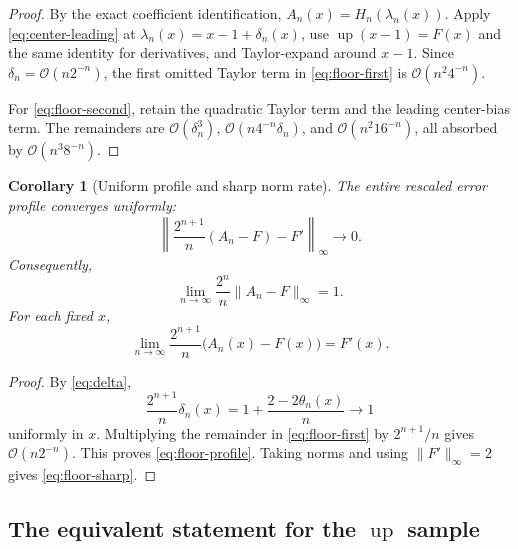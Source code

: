 \documentclass[11pt,oneside]{article}
\newtheorem{corollary}[theorem]{Corollary}
\theoremstyle{definition}
\theoremstyle{remark}
\newcommand{\Up}{\operatorname{up}}
\newcommand{\bigO}{\mathcal O}
\begin{document}
\begin{proof}
By the exact coefficient identification,
$A_n(x)=H_n(\lambda_n(x))$.  Apply \eqref{eq:center-leading} at
$\lambda_n(x)=x-1+\delta_n(x)$, use $\Up(x-1)=F(x)$ and the same identity for derivatives,
and Taylor-expand around $x-1$.  Since $\delta_n=\bigO(n2^{-n})$, the first omitted Taylor
term in \eqref{eq:floor-first} is $\bigO(n^2 4^{-n})$.

For \eqref{eq:floor-second}, retain the quadratic Taylor term and the leading center-bias
term.  The remainders are
$\bigO(\delta_n^3)$, $\bigO(n4^{-n}\delta_n)$, and
$\bigO(n^2 16^{-n})$, all absorbed by $\bigO(n^3 8^{-n})$.
\end{proof}

\begin{corollary}[Uniform profile and sharp norm rate]
\label{cor:floor-sharp}
The entire rescaled error profile converges uniformly:
\begin{equation}
 \left\|\frac{2^{n+1}}n(A_n-F)-F'\right\|_\infty
 \longrightarrow0.                                       \label{eq:floor-profile}
\end{equation}
Consequently,
\begin{equation}
 \lim_{n\to\infty}\frac{2^n}{n}\|A_n-F\|_\infty=1.       \label{eq:floor-sharp}
\end{equation}
For each fixed $x$,
\begin{equation}
 \lim_{n\to\infty}\frac{2^{n+1}}n\bigl(A_n(x)-F(x)\bigr)
 =F'(x).                                                   \label{eq:floor-pointwise-profile}
\end{equation}
\end{corollary}

\begin{proof}
By \eqref{eq:delta},
\[
 \frac{2^{n+1}}n\delta_n(x)
 =1+\frac{2-2\theta_n(x)}n\longrightarrow1
\]
uniformly in $x$.  Multiplying the remainder in \eqref{eq:floor-first} by
$2^{n+1}/n$ gives $\bigO(n2^{-n})$.  This proves \eqref{eq:floor-profile}.  Taking norms and
using $\|F'\|_\infty=2$ gives \eqref{eq:floor-sharp}.
\end{proof}

\subsection{The equivalent statement for the \texorpdfstring{$\Up$}{Up} sample}
\end{document}
